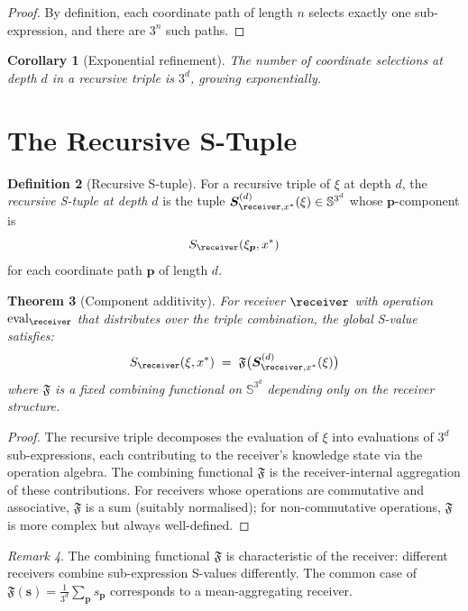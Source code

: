 \documentclass[11pt,a4paper]{article}
\theoremstyle{thmstyle}
\newtheorem{theorem}{Theorem}[section]
\newtheorem{corollary}[theorem]{Corollary}
\theoremstyle{thmstyle}
\theoremstyle{definition}
\newtheorem{definition}[theorem]{Definition}
\theoremstyle{remark}
\newtheorem{remark}[theorem]{Remark}
\DeclareMathOperator{\eval}{eval}
\newcommand{\Sscale}{\mathbb{S}}
\newcommand{\Sscalar}{S}
\begin{document}
\begin{proof}
By definition, each coordinate path of length $n$
selects exactly one sub-expression, and there are
$3^{n}$ such paths.
\end{proof}

\begin{corollary}[Exponential refinement]\label{cor:exp-refinement}
The number of coordinate selections at depth $d$ in
a recursive triple is $3^{d}$, growing exponentially.
\end{corollary}

\section{The Recursive S-Tuple}
\label{sec:recursive-stuple}

\begin{definition}[Recursive S-tuple]\label{def:rec-stuple}
For a recursive triple of $\xi$ at depth $d$, the
\emph{recursive S-tuple at depth $d$} is the tuple
$\bm{S}^{(d)}_{\receiver, x^{*}}(\xi) \in
\Sscale^{3^{d}}$ whose $\bm{p}$-component is
\[
\Sscalar_{\receiver}(\xi_{\bm{p}}, x^{*})
\]
for each coordinate path $\bm{p}$ of length $d$.
\end{definition}

\begin{theorem}[Component additivity]\label{thm:comp-add}
For receiver $\receiver$ with operation
$\eval_{\receiver}$ that distributes over the triple
combination, the global S-value satisfies:
\[
\Sscalar_{\receiver}(\xi, x^{*})
\;=\; \mathfrak{F}\bigl(
   \bm{S}^{(d)}_{\receiver, x^{*}}(\xi) \bigr)
\]
where $\mathfrak{F}$ is a fixed combining functional
on $\Sscale^{3^{d}}$ depending only on the
receiver structure.
\end{theorem}

\begin{proof}
The recursive triple decomposes the evaluation of
$\xi$ into evaluations of $3^{d}$ sub-expressions,
each contributing to the receiver's knowledge state
via the operation algebra.  The combining functional
$\mathfrak{F}$ is the receiver-internal aggregation
of these contributions.  For receivers whose
operations are commutative and associative,
$\mathfrak{F}$ is a sum (suitably normalised); for
non-commutative operations, $\mathfrak{F}$ is more
complex but always well-defined.
\end{proof}

\begin{remark}\label{rem:f-as-receiver-property}
The combining functional $\mathfrak{F}$ is
characteristic of the receiver: different receivers
combine sub-expression S-values differently.  The
common case of $\mathfrak{F}(\bm{s}) = \frac{1}{3^{d}}
\sum_{\bm{p}} s_{\bm{p}}$ corresponds to a
mean-aggregating receiver.
\end{remark}
\end{document}
